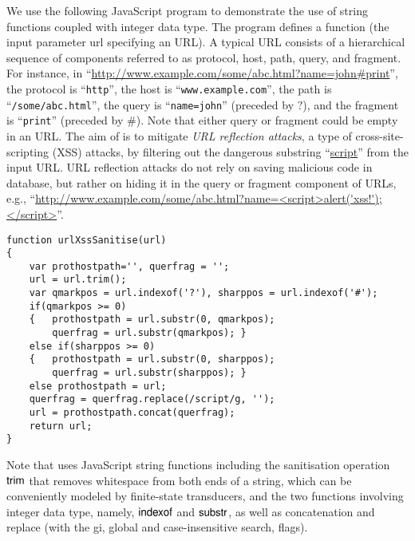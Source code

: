 
\begin{example}\label{exmp:running}
We use the following JavaScript program to demonstrate the use of string functions coupled with integer data type.
The program defines a function {\urlxsssanitise} (the input parameter url specifying an URL). A typical URL consists of a hierarchical sequence of components referred to as protocol, host, path, query, and fragment. For instance, in ``\url{http://www.example.com/some/abc.html?name=john#print}'', the protocol is ``{\tt http}'', the host is ``{\tt www.example.com}'', the path is ``{\tt /some/abc.html}'', the query is ``{\tt name=john}'' (preceded by $?$), and the fragment is ``{\tt print}'' (preceded by $\#$). Note that either query or fragment could be empty in an URL. The aim of {\urlxsssanitise} is to mitigate \emph{URL reflection attacks}, a type of cross-site-scripting (XSS) attacks, by filtering out the dangerous substring ``\url{script}'' from the input URL. URL reflection attacks  do not rely on saving malicious code in database, but rather on hiding it in the query or fragment component of URLs, e.g., ``\url{http://www.example.com/some/abc.html?name=<script>alert('xss!');</script>}''.
{\small
\begin{verbatim}
function urlXssSanitise(url)
{
    var prothostpath='', querfrag = '';
    url = url.trim();
    var qmarkpos = url.indexof('?'), sharppos = url.indexof('#');
    if(qmarkpos >= 0) 
    {   prothostpath = url.substr(0, qmarkpos);
        querfrag = url.substr(qmarkpos); }
    else if(sharppos >= 0)
    {   prothostpath = url.substr(0, sharppos);
        querfrag = url.substr(sharppos); }
    else prothostpath = url;
    querfrag = querfrag.replace(/script/g, '');
    url = prothostpath.concat(querfrag);
    return url;
}
\end{verbatim}
}
%
Note that {\urlxsssanitise} uses JavaScript string functions including the sanitisation operation $\sf trim$ that removes whitespace from both ends of a string, which can be conveniently modeled by finite-state transducers, and the two functions involving integer data type, namely, $\sf indexof$ and $\sf substr$, as well as concatenation and replace (with the gi, global and case-insensitive search, flags).



\end{example}
